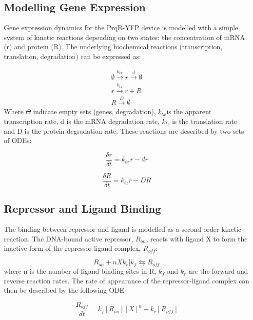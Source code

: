 \subsection{Modelling Gene Expression}
Gene expression dynamics for the PrqR-YFP device is modelled with a simple system of kinetic reactions depending on two states: the concentration of mRNA (r) and protein (R). The underlying biochemical reactions (transcription, translation, degradation) can be expressed as:

\begin{equation}
\begin{gathered}    
    \emptyset \xrightarrow{k_{tx}} r \xrightarrow{d} \emptyset\\
    r \xrightarrow{k_{tz}} r + R\\ 
    R \xrightarrow{D} \emptyset
\end{gathered}
\end{equation}
Where $\Theta$ indicate empty sets (genes, degradation), $k_{tx}$is the apparent transcription rate, d is the mRNA degradation rate, $k_{tz}$ is the translation rate and D is the protein degradation rate. These reactions are described by two sets of ODEs:

\begin{equation}
\label{eq:transcription1}
    \frac{\delta r}{\delta t} = k_{tx}r - dr
\end{equation}

\begin{equation}
    \frac{\delta R}{\delta t} = k_{tz}r - DR
\end{equation}

\subsection{Repressor and Ligand Binding}
The binding between repressor and ligand is modelled as a second-order kinetic reaction. The DNA-bound active repressor, $R_{on}$, reacts with ligand X to form the inactive form of the repressor-ligand complex, $R_{off}$:
\begin{equation}
   R_{on} + nX \stackrel[k_{r}]{k_{f}}{\leftrightarrows} R_{off} 
\end{equation}
where n is the number of ligand binding sites in R,  $k_{f}$ and $k_{r}$ are the forward and reverse reaction rates. The rate of appearance of the repressor-ligand complex can then be described by the following ODE

\begin{equation}
\label{eq:ligandbinding}
    \frac{R_{off}}{dt} = k_{f}[R_{on}][X]^{n} - k_{r}[R_{off}] 
\end{equation}

